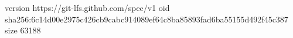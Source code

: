 version https://git-lfs.github.com/spec/v1
oid sha256:6c14d00e2975c426cb9cabc914089ef64c8ba85893fad6ba55155d492f45c387
size 63188
